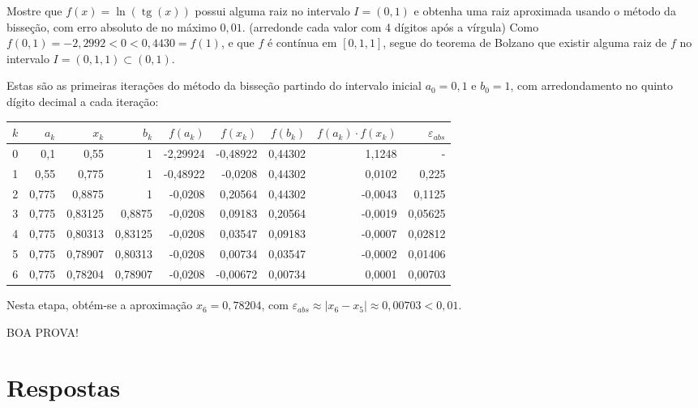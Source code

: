\documentclass[12pt,a4paper]{article}
\newcommand*\tg{\operatorname{tg}}
\begin{document}
\begin{ExerciseList}
\Exercise[title={2,5}] Mostre que $f(x) = \ln(\tg(x))$ possui alguma raiz no intervalo $I = (0, 1)$ e obtenha uma raiz aproximada usando o método da bisseção, com erro absoluto de no máximo $0,01$.
(arredonde cada valor com 4 dígitos após a vírgula)
\Answer Como $f(0,1) = -2,2992 < 0 < 0,4430 = f(1)$, e que $f$ é contínua em $[0,1, 1]$, segue do teorema de Bolzano que existir alguma raiz de $f$ no intervalo $I = (0,1, 1) \subset (0, 1)$.

Estas são as primeiras iterações do método da bisseção partindo do intervalo inicial $a_0 = 0,1$ e $b_0 = 1$, com arredondamento no quinto dígito decimal a cada iteração:
\begin{center}
\begin{tabular}{|r|r|r|r|r|r|r|r|r|}
\hline
$k$ & $a_k$ & $x_k$ & $b_k$ & $f(a_k)$ & $f(x_k)$ & $f(b_k)$ & $f(a_k)\cdot f(x_k)$ & $\varepsilon_{abs}$ \\
\hline
0 & 0,1 & 0,55 & 1 & -2,29924 & -0,48922 & 0,44302 & 1,1248 & -\\\hline
1 & 0,55 & 0,775 & 1 & -0,48922 & -0,0208 & 0,44302 & 0,0102 & 0,225\\\hline
2 & 0,775 & 0,8875 & 1 & -0,0208 & 0,20564 & 0,44302 & -0,0043 & 0,1125\\\hline
3 & 0,775 & 0,83125 & 0,8875 & -0,0208 & 0,09183 & 0,20564 & -0,0019 & 0,05625\\\hline
4 & 0,775 & 0,80313 & 0,83125 & -0,0208 & 0,03547 & 0,09183 & -0,0007 & 0,02812\\\hline
5 & 0,775 & 0,78907 & 0,80313 & -0,0208 & 0,00734 & 0,03547 & -0,0002 & 0,01406\\\hline
6 & 0,775 & 0,78204 & 0,78907 & -0,0208 & -0,00672 & 0,00734 & 0,0001 & 0,00703\\\hline
\end{tabular}
\end{center}
\medskip
Nesta etapa, obtém-se a aproximação $x_6 = 0,78204$, com $\varepsilon_{abs} \approx |x_6-x_5| \approx 0,00703 < 0,01$.

\end{ExerciseList}

\vspace{0.5cm}
\begin{center}
BOA PROVA!
\end{center}

\newpage
\restoregeometry
\section*{Respostas}
\shipoutAnswer
\end{document}
